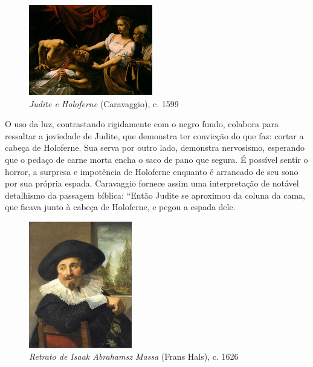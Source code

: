 \begin{figure}
  \begin{center}
    \includegraphics[width=0.48\textwidth]{figs/caravaggio_judite.png}
  \end{center}
  \caption{\emph{Judite e Holoferne} (Caravaggio), c. 1599}
  \label{fig:caravaggio:judite}
\end{figure}

O uso da luz, contrastando rigidamente com o negro fundo, colabora
para ressaltar a joviedade de Judite, que demonstra ter convicção do
que faz: cortar a cabeça de Holoferne. Sua serva por outro lado,
demonstra nervosismo, esperando que o pedaço de carne morta encha o
saco de pano que segura. É possível sentir o horror, a surpresa e
impotência de Holoferne enquanto é arrancado de seu sono por sua
própria espada. Caravaggio fornece assim uma interpretação de notável
detalhismo da passagem bíblica: ``Então Judite se aproximou da coluna
da cama, que ficava junto à cabeça de Holoferne, e pegou a espada
dele. 

\begin{figure}
  \begin{center}
    \includegraphics[width=0.4\textwidth]{figs/hals_massa.png}
  \end{center}
  \caption{\emph{Retrato de Isaak Abrahamsz Massa} (Frans Hals), c. 1626}
  \label{fig:hals:massa}
\end{figure}

